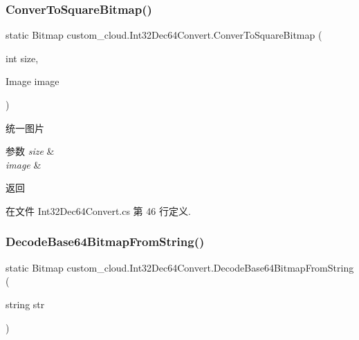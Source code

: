 \subsubsection{\texorpdfstring{Conver\+To\+Square\+Bitmap()}{ConverToSquareBitmap()}}
{\footnotesize\ttfamily static Bitmap custom\+\_\+cloud.\+Int32\+Dec64\+Convert.\+Conver\+To\+Square\+Bitmap (\begin{DoxyParamCaption}\item[{int}]{size,  }\item[{Image}]{image }\end{DoxyParamCaption})\hspace{0.3cm}{\ttfamily [static]}}



统一图片 


\begin{DoxyParams}{参数}
{\em size} & \\
\hline
{\em image} & \\
\hline
\end{DoxyParams}
\begin{DoxyReturn}{返回}

\end{DoxyReturn}


在文件 Int32\+Dec64\+Convert.\+cs 第 46 行定义.

\mbox{\label{classcustom__cloud_1_1_int32_dec64_convert_a1d1e54accecc0717f6d9a584a47765ca}} 
\subsubsection{\texorpdfstring{Decode\+Base64\+Bitmap\+From\+String()}{DecodeBase64BitmapFromString()}}
{\footnotesize\ttfamily static Bitmap custom\+\_\+cloud.\+Int32\+Dec64\+Convert.\+Decode\+Base64\+Bitmap\+From\+String (\begin{DoxyParamCaption}\item[{string}]{str }\end{DoxyParamCaption})\hspace{0.3cm}{\ttfamily [static]}}



